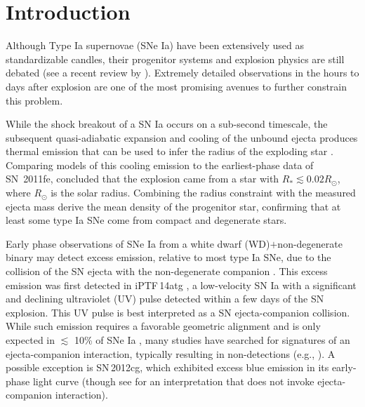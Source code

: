 \documentclass[twocolumn]{aastex61}
\newcommand{\sr}{R_\odot}
\newcommand{\ycao}[1]{{\color{red} ycao: {#1}}}
\begin{document}

\section{Introduction}
\label{sec:intro}

Although Type Ia supernovae (SNe Ia) have been extensively used as
standardizable candles, their progenitor systems and explosion
physics are still debated (see a recent review by
\citealt{2014ARA&A..52..107M}). Extremely detailed
observations in the hours to days after explosion are one of the most promising avenues to further
constrain this problem.

While the shock breakout of a SN Ia occurs on a sub-second timescale,
the subsequent quasi-adiabatic expansion and cooling of the unbound
ejecta produces thermal emission that can be used to infer the
radius of the exploding star
\citep{2010ApJ...708..598P,2011ApJ...728...63R}. Comparing models of
this cooling emission to the earliest-phase data of SN~2011fe,
\citet{2012ApJ...744L..17B} concluded that the explosion came from a 
star with $R_\ast \lesssim 0.02\sr$, where $\sr$ is the solar
radius. Combining the radius constraint with the measured ejecta 
mass \citeauthor{2012ApJ...744L..17B} derive the mean density of the 
progenitor star, confirming that at least some type Ia SNe come from 
compact and degenerate stars. 

Early phase observations of SNe Ia from a white dwarf (WD)$+$non-degenerate binary
may detect excess emission, relative to most type Ia SNe, due to the 
collision of the SN ejecta with the non-degenerate companion 
\citep{1973ApJ...186.1007W,2010ApJ...708.1025K}. This excess 
emission was first detected in iPTF\,14atg  \citep{2015Natur.521..328C}, a low-velocity SN Ia with a significant and declining ultraviolet (UV) pulse detected within a
few days of the SN explosion. This UV pulse is best interpreted as a
SN ejecta-companion collision. While such emission requires a 
favorable geometric alignment and is only expected in $\lesssim$ 
10\% of SNe Ia \citep{2010ApJ...708.1025K}, many studies have 
searched for signatures of an ejecta-companion interaction, 
typically resulting in non-detections 
(e.g., \citealt{2010ApJ...722.1691H,2011ApJ...741...20B,2012ApJ...744...38F,
  2012ApJ...744L..17B,2015Natur.521..332O,
  2013ApJ...778L..15Z,2015ApJ...799..106G,2016ApJ...826..144S,
  2015ApJS..221...22I}). A possible exception is SN\,2012cg, 
which exhibited excess blue emission in its early-phase light curve 
\citet{2016ApJ...820...92M} (though see 
\citealt{2016arXiv161007601S} for an interpretation that does not 
invoke ejecta-companion interaction). 
\end{document}

